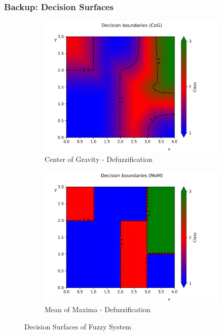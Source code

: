 \documentclass[
	10pt,
	t		%
]{beamer}
\begin{document}
\begin{frame}

	\frametitle{Backup: Decision Surfaces}
	
	\begin{figure}
		\begin{subfigure}[t]{0.49\textwidth}
			\centering
			\includegraphics[width=1\textwidth, trim={0.5cm 0.5cm 1cm 1cm},clip]{figures/fuzzy_system_cog.png}
			\caption{Center of Gravity - Defuzzification}
		\end{subfigure}
		\begin{subfigure}[t]{0.49\textwidth}
			\centering
			\includegraphics[width=1\textwidth, trim={0.5cm 0.5cm 1cm 1cm},clip]{figures/fuzzy_system_mom.png}
			\caption{Mean of Maxima - Defuzzification}
		\end{subfigure}
		\caption{Decision Surfaces of Fuzzy System}
	\end{figure}
	
\end{frame}
\end{document}
